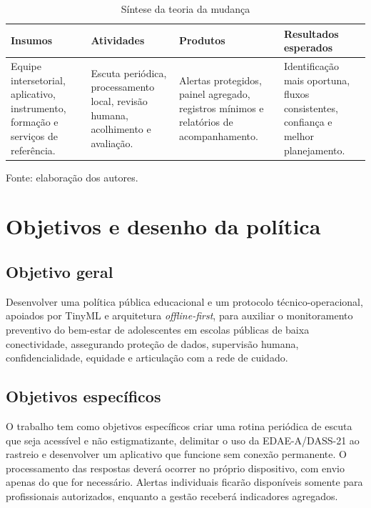 \documentclass[
  12pt,
  openright,
  oneside,
  a4paper,
  english,
  brazil
]{abntex2}
\begin{document}
\begin{table}[htb]
\centering
\caption{Síntese da teoria da mudança}
\begin{tabular}{|p{2.8cm}|p{3.2cm}|p{3.1cm}|p{3.2cm}|}
\hline
\textbf{Insumos} & \textbf{Atividades} & \textbf{Produtos} & \textbf{Resultados esperados} \\
\hline
Equipe intersetorial, aplicativo, instrumento, formação e serviços de referência.
& Escuta periódica, processamento local, revisão humana, acolhimento e avaliação.
& Alertas protegidos, painel agregado, registros mínimos e relatórios de acompanhamento.
& Identificação mais oportuna, fluxos consistentes, confiança e melhor planejamento. \\
\hline
\end{tabular}
\par\smallskip
\small Fonte: elaboração dos autores.
\end{table}



\chapter{Objetivos e desenho da política}

\section{Objetivo geral}

Desenvolver uma política pública educacional e um protocolo técnico-operacional,
apoiados por TinyML e arquitetura \emph{offline-first}, para auxiliar o
monitoramento preventivo do bem-estar de adolescentes em escolas públicas de
baixa conectividade, assegurando proteção de dados, supervisão humana,
confidencialidade, equidade e articulação com a rede de cuidado.

\section{Objetivos específicos}

O trabalho tem como objetivos específicos criar uma rotina periódica de escuta
que seja acessível e não estigmatizante, delimitar o uso da EDAE-A/DASS-21 ao
rastreio e desenvolver um aplicativo que funcione sem conexão permanente. O
processamento das respostas deverá ocorrer no próprio dispositivo, com envio
apenas do que for necessário. Alertas individuais ficarão disponíveis somente
para profissionais autorizados, enquanto a gestão receberá indicadores
agregados.
\end{document}
